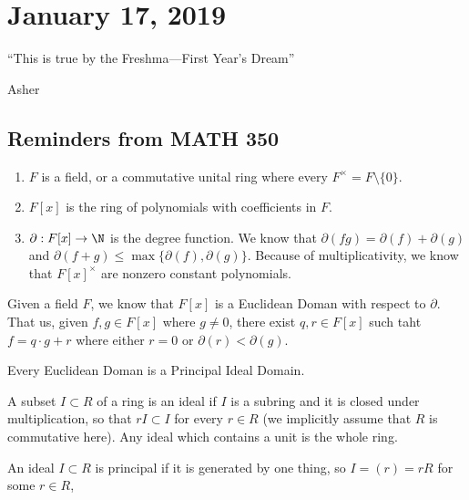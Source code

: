 
\section{January 17, 2019}

\epigraph{``This is true by the Freshma---First Year's Dream''}{Asher}

\subsection{Reminders from MATH 350}

\begin{enumerate}
\item $F$ is a field, or a commutative unital ring where every $F^\times = F \setminus \{0\}$.
\item $F[x]$ is the ring of polynomials with coefficients in $F$.
\item $\partial : F[x] \to \N$ is the degree function. We know that $\partial(fg) = \partial(f) + \partial(g)$ and $\partial(f+g) \leq \max\{\partial(f), \partial(g)\}$. Because of multiplicativity, we know that $F[x]^\times$ are nonzero constant polynomials.
\end{enumerate}

\begin{theorem}
Given a field $F$, we know that $F[x]$ is a Euclidean Doman with respect to $\partial$. That us, given $f,g \in F[x]$ where $g \not= 0$, there exist $q,r \in F[x]$ such taht $f = q \cdot g + r$ where either $r = 0$ or $\partial(r) < \partial(g)$.
\end{theorem}

\begin{theorem}
Every Euclidean Doman is a Principal Ideal Domain. 
\end{theorem}

\begin{definition}[Ideal]
A subset $I \subset R$ of a ring is an ideal if $I$ is a subring and it is closed under multiplication, so that $rI \subset I$ for every $r \in R$ (we implicitly assume that $R$ is commutative here). Any ideal which contains a unit is the whole ring.
\end{definition}

\begin{definition}
An ideal $I \subset R$ is principal if it is generated by one thing, so $I = (r) = rR$ for some $r \in R$,
\end{definition}

